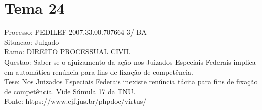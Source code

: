 \documentclass[12pt]{article}
\begin{document}
\section*{Tema 24}
Processo: PEDILEF 2007.33.00.707664-3/ BA\\
Situacao: Julgado\\
Ramo: DIREITO PROCESSUAL CIVIL\\
Questao: Saber se o ajuizamento da ação nos Juizados Especiais Federais implica em automática renúncia para fins de fixação de competência.\\
Tese: Nos Juizados Especiais Federais inexiste renúncia tácita para fins de fixação de competência. Vide Súmula 17 da TNU.\\
Fonte: https://www.cjf.jus.br/phpdoc/virtus/
\end{document}
